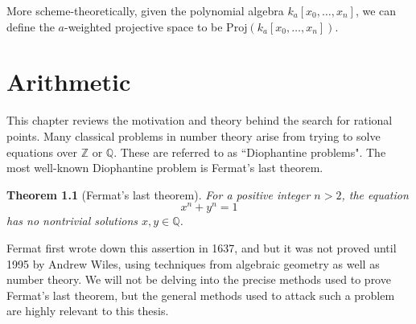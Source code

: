 \documentclass[12pt,twoside]{reedthesis}
\theoremstyle{plain}
\newtheorem{theorem}{Theorem}[chapter]
\theoremstyle{definition}
\theoremstyle{remark}
\newcommand{\ZZ}{\mathbb{Z}}
\newcommand{\QQ}{\mathbb{Q}}
\begin{document}
More scheme-theoretically, given the polynomial algebra $k_a[x_0,\ldots,x_n]$, we can define the $a$-weighted projective space to be $\text{Proj}(k_a[x_0,\ldots,x_n])$.
\chapter{Arithmetic}
This chapter reviews the motivation and theory behind the search for rational points. Many classical problems in number theory arise from trying to solve equations over $\ZZ$ or $\QQ$. These are referred to as ``Diophantine problems". The most well-known Diophantine problem is Fermat's last theorem.
\begin{theorem}[Fermat's last theorem]
For a positive integer $n>2$, the equation \[x^n+y^n=1\] has no nontrivial solutions $x,y\in\QQ$.
\end{theorem}
\noindent Fermat first wrote down this assertion in 1637, and but it was not proved until 1995 by Andrew Wiles, using techniques from algebraic geometry as well as number theory. We will not be delving into the precise methods used to prove Fermat's last theorem, but the general methods used to attack such a problem are highly relevant to this thesis.
\end{document}
